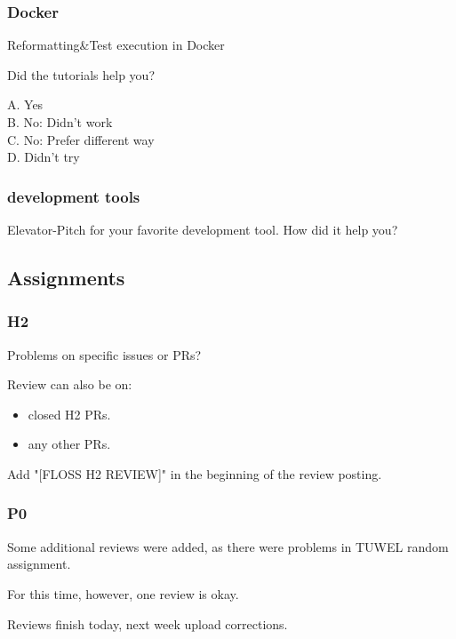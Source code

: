 \begin{frame}
	\frametitle{Docker}

	Reformatting\&Test execution in Docker

	Did the tutorials help you?

	A. Yes \\
	B. No: Didn't work \\
	C. No: Prefer different way \\
	D. Didn't try
\end{frame}

\begin{frame}
	\frametitle{development tools}

	\begin{task}
	Elevator-Pitch for your favorite development tool.
	How did it help you?
	\end{task}
\end{frame}

\breakframe


\subsection{Assignments}

\begin{assignment}
	\frametitle{H2}

	\begin{task}
	Problems on specific issues or PRs?
	\end{task}

	Review can also be on:
	\begin{itemize}
		\item closed H2 PRs.
		\item any other PRs.
	\end{itemize}

	\begin{task}
	Add "[FLOSS H2 REVIEW]" in the beginning of the review posting.
	\end{task}
\end{assignment}

\begin{assignment}
	\frametitle{P0}

	Some additional reviews were added, as there were problems in TUWEL random assignment.

	For this time, however, one review is okay.

	\begin{task}
	Reviews finish today, next week upload corrections.
	\end{task}
\end{assignment}

